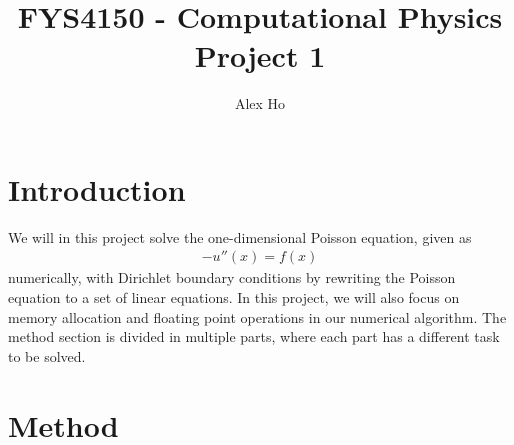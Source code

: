 \documentclass[12pt]{article}
\author{Alex Ho}
\title{FYS4150 - Computational Physics \\ Project 1}
\begin{document}
\maketitle
\section{Introduction}
We will in this project solve the one-dimensional Poisson equation, given as
\begin{align}
-u''(x) = f(x)
\end{align}
numerically, with Dirichlet boundary conditions by rewriting the Poisson equation to a set of linear equations. In this project, we will also focus on memory allocation and floating point operations in our numerical algorithm.  The method section is divided in multiple parts, where each part has a different task to be solved.
\section{Method}
\end{document}

